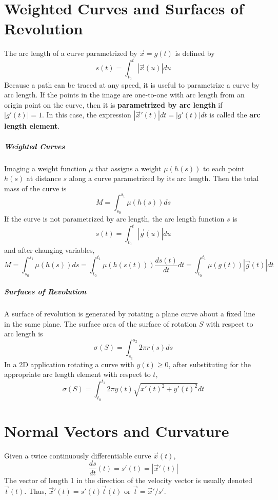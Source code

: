 \documentclass[11pt]{article}
\begin{document}
\section{Weighted Curves and Surfaces of Revolution}
	The arc length of a curve parametrized by $\vec{x} = g(t)$ is defined by
	\begin{equation}
		s(t) = \int_{t_0}^t |\vec{x}(u)| du
	\end{equation}
	Because a path can be traced at any speed, it is useful to parametrize a curve by arc length. If the points in the image are one-to-one with arc length from an origin point on the curve, then it is \textbf{parametrized by arc length} if $|g'(t)| = 1$. In this case, the expression $|\vec{x}'(t)|dt = |g'(t)|dt$ is called the \textbf{arc length element}.
	
	\subparagraph{Weighted Curves} Imaging a weight function $\mu$ that assigns a weight $\mu(h(s))$ to each point $h(s)$ at distance $s$ along a curve parametrized by its arc length. Then the total mass of the curve is
	\begin{equation}
		M = \int_{s_0}^{s_1} \mu(h(s))ds
	\end{equation}
	If the curve is not parametrized by arc length, the arc length function $s$ is
	\begin{equation}
		s(t) = \int_{t_0}^t |\vec{g}(u)|du
	\end{equation}
	and after changing variables,
	\begin{equation}
		M = \int_{s_0}^{s_1} \mu(h(s))ds = \int_{t_0}^{t_1} \mu(h(s(t)))\frac{ds(t)}{dt}dt = \int_{t_0}^{t_1} \mu(g(t))|\vec{g}(t)|dt
	\end{equation}
	
	\subparagraph{Surfaces of Revolution} A surface of revolution is generated by rotating a plane curve about a fixed line in the same plane. The surface area of the surface of rotation $S$ with respect to arc length is
	\begin{equation}
		\sigma (S) = \int_{s_1}^{s_2} 2\pi r(s)ds
	\end{equation}
	In a 2D application rotating a curve with $y(t) \geq 0$, after substituting for the appropriate arc length element with respect to $t$,
	\begin{equation}
		\sigma (S) = \int_{t_0}^{t_1} 2\pi y(t) \sqrt{x'(t)^2 + y'(t)^2} dt
	\end{equation}
	
\section{Normal Vectors and Curvature}
	Given a twice continuously differentiable curve $\vec{x}(t)$,
	\begin{equation}
		\frac{ds}{dt}(t) = s'(t) = |\vec{x}'(t)|
	\end{equation}
	The vector of length 1 in the direction of the velocity vector is usually denoted $\vec{t}(t)$.  Thus, $\vec{x}'(t) = s'(t)\vec{t}(t)$ or $\vec{t} = \vec{x}' / s'$.
	
\end{document}
